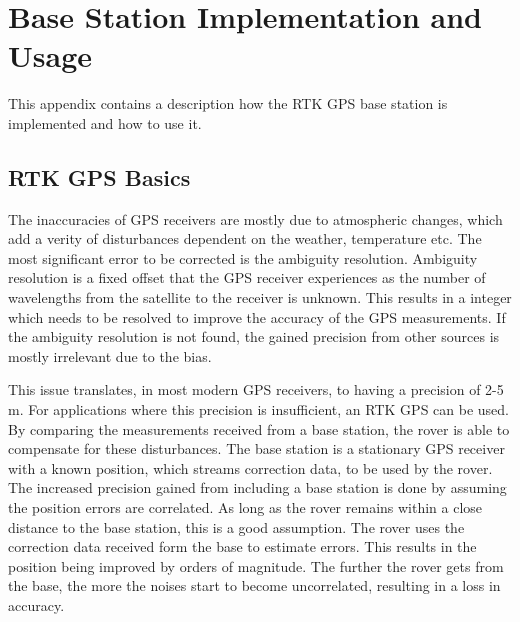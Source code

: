 \chapter{Base Station Implementation and Usage}\label{app:rtk_gps}
This appendix contains a description how the RTK GPS base station is implemented and how to use it.

\section*{RTK GPS Basics}
The inaccuracies of GPS receivers are mostly due to atmospheric changes, which add a verity of disturbances dependent on the weather, temperature etc.
The most significant error to be corrected is the ambiguity resolution. Ambiguity resolution is a fixed offset that the GPS receiver experiences as the number of wavelengths from the satellite to the receiver is unknown. This results in a integer which needs to be resolved to improve the accuracy of the GPS measurements. If the ambiguity resolution is not found, the gained precision from other sources is mostly irrelevant due to the bias. \cite{novatel} \cite{RTK_GPS} \cite{ambg_res}

This issue translates, in most modern GPS receivers, to having a precision of 2-5 m. For applications where this precision is insufficient, an RTK GPS can be used. By comparing the measurements received from a base station, the rover is able to compensate for these disturbances. The base station is a stationary GPS receiver with a known position, which streams correction data, to be used by the rover. The increased precision gained from including a base station is done by assuming the position errors are correlated. As long as the rover remains within a close distance to the base station, this is a good assumption. The rover uses the correction data received form the base to estimate errors. This results in the position being improved by orders of magnitude. 
The further the rover gets from the base, the more the noises start to become uncorrelated, resulting in a loss in accuracy.\cite{EmlidRTK}\cite{RTK_GPS}




